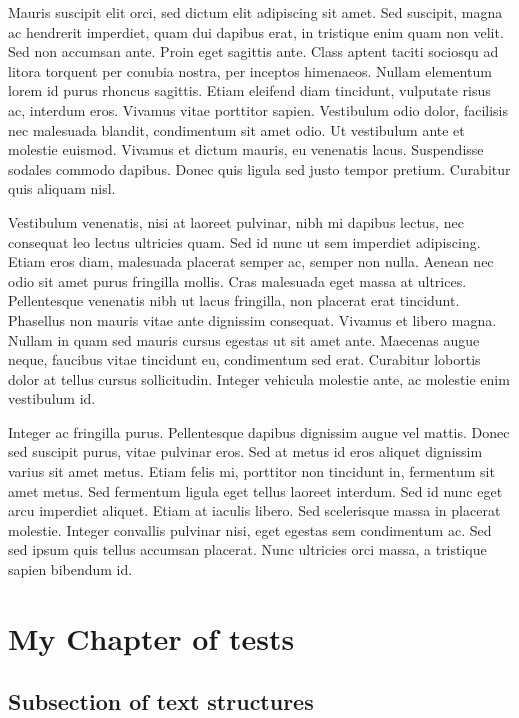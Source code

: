 \documentclass[9pt]{memoir}
\begin{document}
Mauris suscipit elit orci, sed dictum elit adipiscing sit amet. Sed suscipit, magna ac hendrerit imperdiet, quam dui dapibus erat, in tristique enim quam non velit. Sed non accumsan ante. Proin eget sagittis ante. Class aptent taciti sociosqu ad litora torquent per conubia nostra, per inceptos himenaeos. Nullam elementum lorem id purus rhoncus sagittis. Etiam eleifend diam tincidunt, vulputate risus ac, interdum eros. Vivamus vitae porttitor sapien. Vestibulum odio dolor, facilisis nec malesuada blandit, condimentum sit amet odio. Ut vestibulum ante et molestie euismod. Vivamus et dictum mauris, eu venenatis lacus. Suspendisse sodales commodo dapibus. Donec quis ligula sed justo tempor pretium. Curabitur quis aliquam nisl.

Vestibulum venenatis, nisi at laoreet pulvinar, nibh mi dapibus lectus, nec consequat leo lectus ultricies quam. Sed id nunc ut sem imperdiet adipiscing. Etiam eros diam, malesuada placerat semper ac, semper non nulla. Aenean nec odio sit amet purus fringilla mollis. Cras malesuada eget massa at ultrices. Pellentesque venenatis nibh ut lacus fringilla, non placerat erat tincidunt. Phasellus non mauris vitae ante dignissim consequat. Vivamus et libero magna. Nullam in quam sed mauris cursus egestas ut sit amet ante. Maecenas augue neque, faucibus vitae tincidunt eu, condimentum sed erat. Curabitur lobortis dolor at tellus cursus sollicitudin. Integer vehicula molestie ante, ac molestie enim vestibulum id.

Integer ac fringilla purus. Pellentesque dapibus dignissim augue vel mattis. Donec sed suscipit purus, vitae pulvinar eros. Sed at metus id eros aliquet dignissim varius sit amet metus. Etiam felis mi, porttitor non tincidunt in, fermentum sit amet metus. Sed fermentum ligula eget tellus laoreet interdum. Sed id nunc eget arcu imperdiet aliquet. Etiam at iaculis libero. Sed scelerisque massa in placerat molestie. Integer convallis pulvinar nisi, eget egestas sem condimentum ac. Sed sed ipsum quis tellus accumsan placerat. Nunc ultricies orci massa, a tristique sapien bibendum id.

\chapter{My Chapter of tests}
\label{chap:my-chap}

\section{Subsection of text structures}
\end{document}
